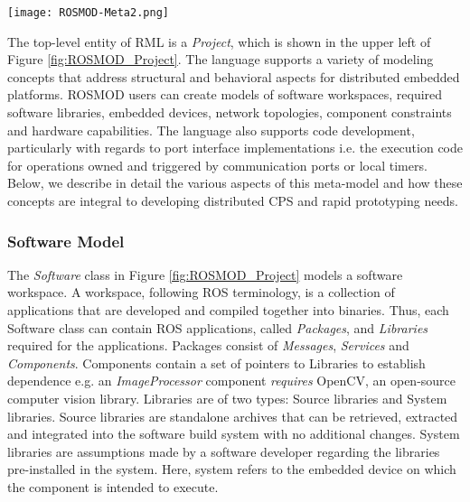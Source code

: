 \begin{figure*}[ht]
	\centering
	\texttt{[image: ROSMOD-Meta2.png]}
	\caption{ROSMOD Metamodel.  Containment is specified from
		\emph{src} to \emph{dst} where the source has a containment
		attribute \emph{quantity}, meaning that \emph{quantity}
		objects of type \emph{src} can be contained in an object of
		type \emph{dst}. Pointers are specified as a one to one
		mapping from source to destination, using the name of the
		pointer.  Sets allow for pointer containment.  All objects
		contain a \emph{name} attribute of type \emph{string}, not
		shown for clarity.  Note: the meta-model is used to create
		the ROSMOD Modeling Language, but users do not see or
		interact with it; it is used to enforce proper model
		creation semantics. }
	\label{fig:ROSMOD_Project}	
\end{figure*}
\FloatBarrier

The top-level entity of RML is a \emph{Project}, which is shown in the
upper left of Figure \ref{fig:ROSMOD_Project}.  The language supports
a variety of modeling concepts that address structural and behavioral
aspects for distributed embedded platforms. ROSMOD users can create
models of software workspaces, required software libraries, embedded
devices, network topologies, component constraints and hardware
capabilities. The language also supports code development,
particularly with regards to port interface implementations i.e. the
execution code for operations owned and triggered by communication
ports or local timers. Below, we describe in detail the various
aspects of this meta-model and how these concepts are integral to
developing distributed CPS and rapid prototyping needs.

\subsubsection{Software Model}

The \emph{Software} class in Figure \ref{fig:ROSMOD_Project} models a
software workspace. A workspace, following ROS terminology, is a
collection of applications that are developed and compiled together
into binaries. Thus, each Software class can contain ROS applications,
called \emph{Packages}, and \emph{Libraries} required for the
applications. Packages consist of \emph{Messages}, \emph{Services} and
\emph{Components}. Components contain a set of pointers to Libraries
to establish dependence e.g. an \emph{ImageProcessor} component
\emph{requires} OpenCV, an open-source computer vision
library. Libraries are of two types: Source libraries and System
libraries. Source libraries are standalone archives that can be
retrieved, extracted and integrated into the software build system
with no additional changes. System libraries are assumptions made by a
software developer regarding the libraries pre-installed in the
system. Here, system refers to the embedded device on which the
component is intended to execute.


